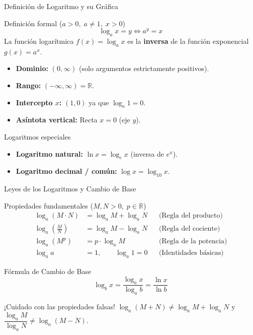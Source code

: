 \documentclass[aspectratio=169]{beamer}
\begin{document}
\begin{frame}{Definición de Logaritmo y su Gráfica}
  \begin{block}{Definición formal ($a > 0, \; a \neq 1, \; x > 0$)}
    $$\boxed{\log_a x = y \iff a^y = x}$$
    La función logarítmica $f(x) = \log_a x$ es la \textbf{inversa} de la función exponencial $g(x) = a^x$.
    \begin{itemize}
      \item \textbf{Dominio:} $(0, \infty)$ (solo argumentos estrictamente positivos).
      \item \textbf{Rango:} $(-\infty, \infty) = \mathbb{R}$.
      \item \textbf{Intercepto $x$:} $(1, 0)$ ya que $\log_a 1 = 0$.
      \item \textbf{Asíntota vertical:} Recta $x = 0$ (eje $y$).
    \end{itemize}
  \end{block}

  \vspace{4pt}
  \begin{block}{Logaritmos especiales}
    \begin{itemize}
      \item \textbf{Logaritmo natural:} $\ln x = \log_e x$ \quad (inversa de $e^x$).
      \item \textbf{Logaritmo decimal / común:} $\log x = \log_{10} x$.
    \end{itemize}
  \end{block}
\end{frame}

\begin{frame}{Leyes de los Logaritmos y Cambio de Base}
  \begin{block}{Propiedades fundamentales ($M, N > 0, \; p \in \mathbb{R}$)}
    \begin{align*}
      \log_a(M \cdot N) &= \log_a M + \log_a N && \text{(Regla del producto)} \\
      \log_a\left(\frac{M}{N}\right) &= \log_a M - \log_a N && \text{(Regla del cociente)} \\
      \log_a(M^p) &= p \cdot \log_a M && \text{(Regla de la potencia)} \\
      \log_a a &= 1, \qquad \log_a 1 = 0 && \text{(Identidades básicas)}
    \end{align*}
  \end{block}

  \vspace{4pt}
  \begin{block}{Fórmula de Cambio de Base}
    $$\boxed{\log_b x = \frac{\log_a x}{\log_a b} = \frac{\ln x}{\ln b}}$$
  \end{block}

  \vspace{4pt}
  \begin{alertblock}{¡Cuidado con las propiedades falsas!}
    $\log_a(M + N) \neq \log_a M + \log_a N$ \quad y \quad $\dfrac{\log_a M}{\log_a N} \neq \log_a(M - N)$.
  \end{alertblock}
\end{frame}
\end{document}

